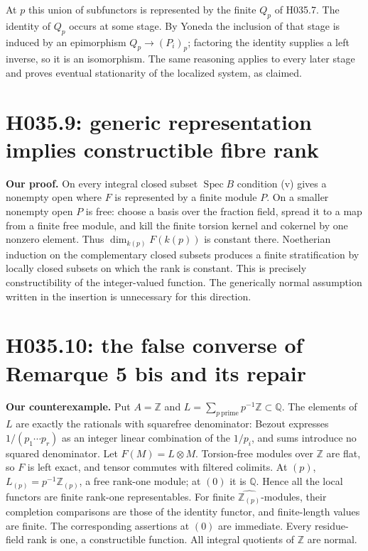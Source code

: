 At $p$ this union of subfunctors is represented by the finite $Q_p$ of
H035.7. The identity of $Q_p$ occurs at some stage. By Yoneda the
inclusion of that stage is induced by an epimorphism $Q_p\to(P_i)_p$;
factoring the identity supplies a left inverse, so it is an isomorphism.
The same reasoning applies to every later stage and proves eventual
stationarity of the localized system, as claimed.

\section{H035.9: generic representation implies constructible fibre rank}
\textbf{Our proof.} On every integral closed subset $\operatorname{Spec}B$
condition (v) gives a nonempty open where $F$ is represented by a finite
module $P$. On a smaller nonempty open $P$ is free: choose a basis over
the fraction field, spread it to a map from a finite free module, and
kill the finite torsion kernel and cokernel by one nonzero element.
Thus $\dim_{k(p)}F(k(p))$ is constant there. Noetherian induction on
the complementary closed subsets produces a finite stratification by
locally closed subsets on which the rank is constant. This is precisely
constructibility of the integer-valued function. The generically normal
assumption written in the insertion is unnecessary for this direction.

\section{H035.10: the false converse of Remarque 5 bis and its repair}
\textbf{Our counterexample.} Put $A=\mathbb Z$ and
$L=\sum_{p\ {\mathrm{prime}}}p^{-1}\mathbb Z\subset\mathbb Q$.
The elements of $L$ are exactly the rationals with squarefree
denominator: Bezout expresses $1/(p_1\cdots p_r)$ as an integer
linear combination of the $1/p_i$, and sums introduce no squared
denominator. Let $F(M)=L\otimes M$. Torsion-free modules over $\mathbb Z$
are flat, so $F$ is left exact, and tensor commutes with filtered colimits.
At $(p)$, $L_{(p)}=p^{-1}\mathbb Z_{(p)}$, a free rank-one module;
at $(0)$ it is $\mathbb Q$. Hence all the local functors are finite
rank-one representables. For finite $\widehat{\mathbb Z_{(p)}}$-modules,
their completion comparisons are those of the identity functor, and
finite-length values are finite. The corresponding assertions at $(0)$
are immediate. Every residue-field rank is one, a constructible function.
All integral quotients of $\mathbb Z$ are normal.

